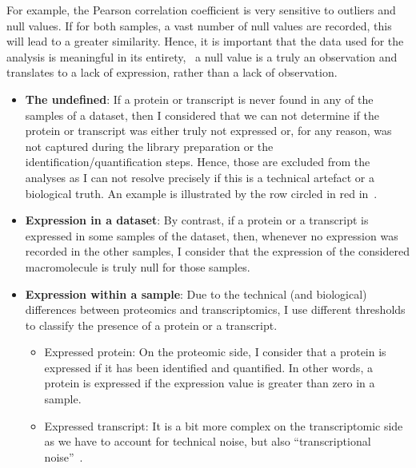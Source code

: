 For example, the Pearson correlation coefficient is very
sensitive to outliers and null values. If for both samples, a vast number of
null values are recorded, this will lead to a greater similarity.
Hence, it is important that the data used for the analysis is meaningful in
its entirety, \ie\ a null value is a truly an observation and translates to
a lack of expression, rather than a lack of observation.\mybr\

\begin{itemize}
        \item\textbf{The undefined}:\label{subsec:ExpressedOrNot-undefined} %
        If a protein or transcript is never found in any of the samples of a dataset,
        then I considered that we can not determine if the protein or transcript was
        either truly not expressed or, for any reason, was not captured during the library
        preparation or the identification/quantification steps. Hence, those are
        excluded from the analyses as I can not resolve precisely if this is a
        technical artefact or a biological truth. An example is illustrated by the row
        circled in red in~.
        \item\textbf{Expression in a dataset}:\label{subsec:ExpressedOrNot--expDataset} %
        By contrast, if a protein or a transcript is expressed in some samples of the
        dataset, then, whenever no expression was recorded in the other
        samples, I consider that the expression of the considered macromolecule is truly
        null for those samples.
        \item\textbf{Expression within a sample}:
        Due to the technical (and biological) differences between proteomics and
        transcriptomics, I use different thresholds to classify the presence of
        a protein or a transcript.
        \begin{itemize}
                \item\textsf{Expressed protein}:
                On the proteomic side, I consider that a protein is expressed
                if it has been identified and quantified.
                In other words, a protein is expressed
                if the expression value is greater than zero in a sample.
                \item\textsf{Expressed transcript}:\label{subsubsec:exprTrans} %
                It is a bit more complex on the transcriptomic side as
                we have to account for technical noise,
                but also \enquote{transcriptional noise}~.

\end{itemize}
\end{itemize}
